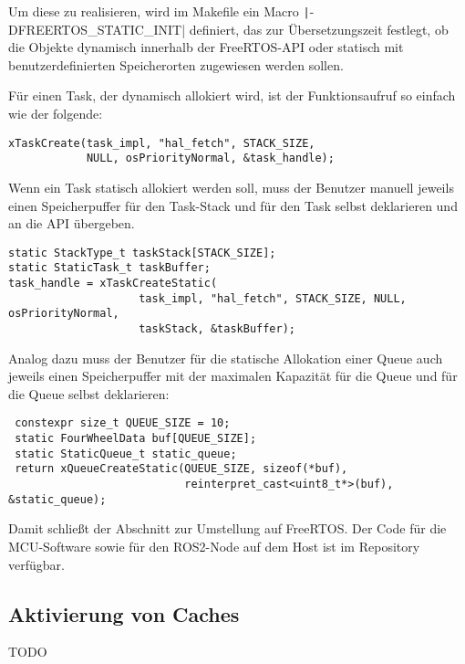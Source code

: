 Um diese zu realisieren, wird im Makefile ein Macro
\texttt|-DFREERTOS_STATIC_INIT| definiert, das zur
Übersetzungszeit festlegt, ob die Objekte dynamisch innerhalb der FreeRTOS-API
oder statisch mit benutzerdefinierten Speicherorten zugewiesen werden sollen.

Für einen Task, der dynamisch allokiert wird, ist der Funktionsaufruf so einfach
wie der folgende:

\begin{code}
\begin{verbatim}
xTaskCreate(task_impl, "hal_fetch", STACK_SIZE,
            NULL, osPriorityNormal, &task_handle);
\end{verbatim}
\end{code}

Wenn ein Task statisch allokiert werden soll, muss der Benutzer manuell jeweils
einen Speicherpuffer für den Task-Stack und für den Task selbst deklarieren und
an die API übergeben.

\begin{code}
\begin{verbatim}
static StackType_t taskStack[STACK_SIZE];
static StaticTask_t taskBuffer;
task_handle = xTaskCreateStatic(
                    task_impl, "hal_fetch", STACK_SIZE, NULL, osPriorityNormal,
                    taskStack, &taskBuffer);
\end{verbatim}
\end{code}

Analog dazu muss der Benutzer für die statische Allokation einer Queue auch
jeweils einen Speicherpuffer mit der maximalen Kapazität für die Queue und für
die Queue selbst deklarieren:

\begin{code}
\begin{verbatim}
 constexpr size_t QUEUE_SIZE = 10;
 static FourWheelData buf[QUEUE_SIZE];
 static StaticQueue_t static_queue;
 return xQueueCreateStatic(QUEUE_SIZE, sizeof(*buf),
                           reinterpret_cast<uint8_t*>(buf), &static_queue);
\end{verbatim}
\end{code}

Damit schließt der Abschnitt zur Umstellung auf FreeRTOS. Der Code für die
MCU-Software sowie für den ROS2-Node auf dem Host ist im
Repository~\cite{mecarover_freertos_profiling} verfügbar.

\newpage

\subsection{Aktivierung von Caches}

TODO
